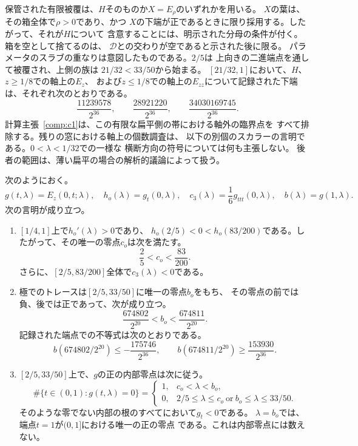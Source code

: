 保管された有限被覆は、$H$そのものか$X=E_\rho$のいずれかを用いる。
$X$の葉は、その箱全体で$\rho>0$であり、かつ
$X$の下端が正であるときに限り採用する。したがって、それが$H$について
含意することには、明示された分母の条件が付く。箱を空として捨てるのは、
$\mathcal D$との交わりが空であると示された後に限る。
パラメータのスラブの重なりは意図したものである。$2/5$は
上向きの二進端点を通して被覆され、上側の族は
$21/32<33/50$から始まる。
$[21/32,1]$において、$H$、$z\geq1/8$での軸上の$E_z$、
および$z\leq1/8$での軸上の$E_{zz}$について記録された下端は、それぞれ次のとおりである。
\[
 \frac{11239578}{2^{36}},\qquad
 \frac{28921220}{2^{36}},\qquad
 \frac{34030169745}{2^{36}}.
\]
計算主張~\ref{comp:c1}は、この有限な扁平側の帯における軸外の臨界点を
すべて排除する。残りの窓における軸上の個数調査は、
以下の別個のスカラーの言明である。$0<\lambda<1/32$での一様な
横断方向の符号については何も主張しない。
後者の範囲は、薄い扁平の場合の解析的議論によって扱う\citep{data-oblate-full}。

\begin{computationalassertion}[扁平側における軸上のスカラー個数調査]
\label{comp:c2}
次のようにおく。
\[
 g(t,\lambda)=E_z(0,t;\lambda),\quad
 h_o(\lambda)=g_t(0,\lambda),\quad
 c_3(\lambda)=\frac16 g_{ttt}(0,\lambda),\quad
 b(\lambda)=g(1,\lambda).
\]
次の言明が成り立つ。
\begin{enumerate}
 \item $[1/4,1]$上で$h_o'(\lambda)>0$であり、
 $h_o(2/5)<0<h_o(83/200)$である。したがって、その唯一の零点$c_o$は次を満たす。
 \[
  \frac25<c_o<\frac{83}{200}.
 \]
 さらに、$[2/5,83/200]$全体で$c_3(\lambda)<0$である。
 \item 極でのトレースは$[2/5,33/50]$に唯一の零点$b_o$をもち、
 その零点の前では負、後では正であって、次が成り立つ。
 \[
  \frac{674802}{2^{20}}<b_o<\frac{674811}{2^{20}}.
 \]
 記録された端点での不等式は次のとおりである。
 \[
  b(674802/2^{20})\leq-\frac{175746}{2^{36}},\qquad
  b(674811/2^{20})\geq\frac{153930}{2^{36}}.
 \]
 \item $[2/5,33/50]$上で、$g$の正の内部零点は次に従う。
 \[
  \#\{t\in(0,1):g(t,\lambda)=0\}
  =\begin{cases}
    1,&c_o<\lambda<b_o,\\
    0,&2/5\leq\lambda\leq c_o\ \text{or}\ b_o\leq\lambda\leq33/50.
   \end{cases}
 \]
 そのような零でない内部の根のすべてにおいて$g_t<0$である。
 $\lambda=b_o$では、端点$t=1$が$(0,1]$における唯一の正の零点
 である。これは内部零点には数えない。
\end{enumerate}
\end{computationalassertion}

